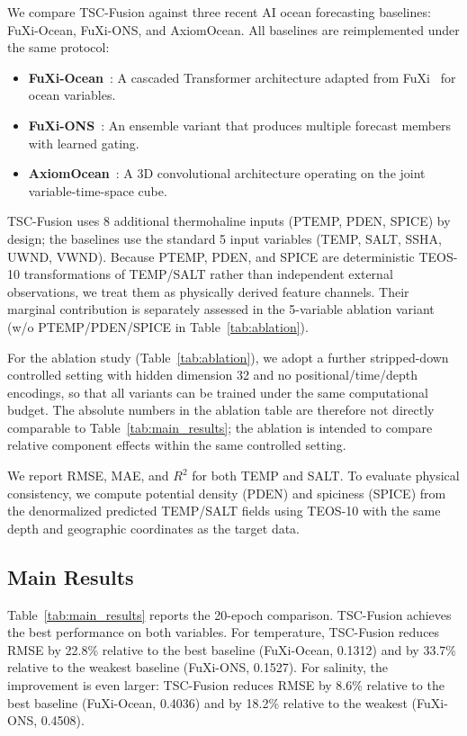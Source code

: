 \documentclass[conference]{IEEEtran}
\begin{document}
We compare TSC-Fusion against three recent AI ocean forecasting baselines: FuXi-Ocean, FuXi-ONS, and AxiomOcean. All baselines are reimplemented under the same protocol:
\begin{itemize}
    \item \textbf{FuXi-Ocean}~\cite{huangFuXiOceanGlobalOcean2025}: A cascaded Transformer architecture adapted from FuXi~\cite{chen2023fuxi} for ocean variables.
    \item \textbf{FuXi-ONS}~\cite{huangFuXiONSDataDrivenEnsemble2026}: An ensemble variant that produces multiple forecast members with learned gating.
    \item \textbf{AxiomOcean}~\cite{wuAxiomOceanForecastingThreeDimensional2026}: A 3D convolutional architecture operating on the joint variable-time-space cube.
\end{itemize}

TSC-Fusion uses 8 additional thermohaline inputs (PTEMP, PDEN, SPICE) by design; the baselines use the standard 5 input variables (TEMP, SALT, SSHA, UWND, VWND). Because PTEMP, PDEN, and SPICE are deterministic TEOS-10 transformations of TEMP/SALT rather than independent external observations, we treat them as physically derived feature channels. Their marginal contribution is separately assessed in the 5-variable ablation variant (w/o PTEMP/PDEN/SPICE in Table~\ref{tab:ablation}).

For the ablation study (Table~\ref{tab:ablation}), we adopt a further stripped-down controlled setting with hidden dimension 32 and no positional/time/depth encodings, so that all variants can be trained under the same computational budget. The absolute numbers in the ablation table are therefore not directly comparable to Table~\ref{tab:main_results}; the ablation is intended to compare relative component effects within the same controlled setting.

We report RMSE, MAE, and $R^2$ for both TEMP and SALT. To evaluate physical consistency, we compute potential density (PDEN) and spiciness (SPICE) from the denormalized predicted TEMP/SALT fields using TEOS-10 with the same depth and geographic coordinates as the target data.

\subsection{Main Results}

Table~\ref{tab:main_results} reports the 20-epoch comparison. TSC-Fusion achieves the best performance on both variables. For temperature, TSC-Fusion reduces RMSE by 22.8\% relative to the best baseline (FuXi-Ocean, 0.1312) and by 33.7\% relative to the weakest baseline (FuXi-ONS, 0.1527). For salinity, the improvement is even larger: TSC-Fusion reduces RMSE by 8.6\% relative to the best baseline (FuXi-Ocean, 0.4036) and by 18.2\% relative to the weakest (FuXi-ONS, 0.4508).
\end{document}
